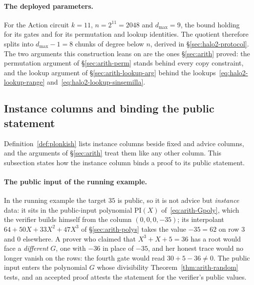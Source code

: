 \documentclass[11pt,a4paper]{article}
\theoremstyle{definition}
\begin{document}
\paragraph{The deployed parameters.}
For the Action circuit $k = 11$, $n = 2^{11} = 2048$ and $d_{\max} = 9$,
the bound holding for its gates and for its permutation and lookup
identities. The quotient therefore splits into $d_{\max} - 1 = 8$ chunks
of degree below $n$, derived in \S\ref{sec:halo2-protocol}. The two
arguments this construction leans on are the ones \S\ref{sec:arith}
proved: the permutation argument of \S\ref{sec:arith-perm} stands behind
every copy constraint, and the lookup argument of
\S\ref{sec:arith-lookup-arg} behind the
lookups~\eqref{eq:halo2-lookup-range}
and~\eqref{eq:halo2-lookup-sinsemilla}.

\subsection{Instance columns and binding the public statement}
\label{sec:halo2-instance}

Definition~\ref{def:plonkish} lists instance columns beside fixed and
advice columns, and the arguments of \S\ref{sec:arith} treat them like
any other column. This subsection states how the instance column binds a
proof to its public statement.

\paragraph{The public input of the running example.}
In the running example the target $35$ is public, so it is not advice but
\emph{instance} data: it sits in the public-input polynomial
$\mathrm{PI}(X)$ of~\eqref{eq:arith-Gpoly}, which the verifier builds
himself from the column $(0, 0, 0, -35)$; its interpolant
$64 + 50X + 33X^2 + 47X^3$ of \S\ref{sec:arith-polys} takes the value
$-35 = 62$ on row $3$ and $0$ elsewhere. A prover who claimed that
$X^3 + X + 5 = 36$ has a root would face a \emph{different} $G$, one with $-36$
in place of $-35$, and her honest trace would no longer vanish on the
rows: the fourth gate would read $30 + 5 - 36 \ne 0$. The public input
enters the polynomial $G$ whose divisibility
Theorem~\ref{thm:arith-random} tests, and an accepted proof attests the
statement for the verifier's public values.
\end{document}
